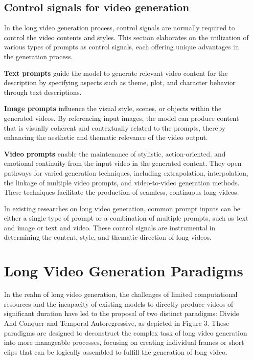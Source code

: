 \documentclass{article}
\begin{document}
\subsection{Control signals for video generation}
In the long video generation process, control signals are normally required to control the video contents and styles. This section elaborates on the utilization of various types of prompts as control signals, each offering unique advantages in the generation process.

\noindent\textbf{Text prompts} guide the model to generate relevant video content for the description by specifying aspects such as theme, plot, and character behavior through text descriptions. 

\noindent\textbf{Image prompts} influence the visual style, scenes, or objects within the generated videos. By referencing input images, the model can produce content that is visually coherent and contextually related to the prompts, thereby enhancing the aesthetic and thematic relevance of the video output.


\noindent\textbf{Video prompts} enable the maintenance of stylistic, action-oriented, and emotional continuity from the input video in the generated content. They open pathways for varied generation techniques, including extrapolation, interpolation, the linkage of multiple video prompts, and video-to-video generation methods. These techniques facilitate the production of seamless, continuous long videos.


In existing researches on long video generation, common prompt inputs can be either a single type of prompt or a combination of multiple prompts, such as text and image or text and video. These control signals are instrumental in determining the content, style, and thematic direction of long videos.
\section{Long Video Generation Paradigms}
In the realm of long video generation, the challenges of limited computational resources and the incapacity of existing models to directly produce videos of significant duration have led to the proposal of two distinct paradigms: Divide And Conquer and Temporal Autoregressive, as depicted in Figure 3. These paradigms are designed to deconstruct the complex task of long video generation into more manageable processes, focusing on creating individual frames or short clips that can be logically assembled to fulfill the generation of long video.
\end{document}
